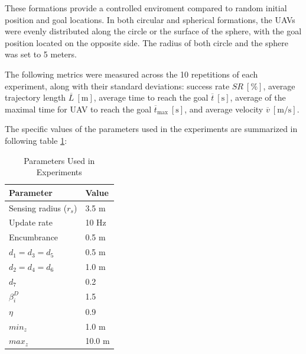         These formations provide a controlled enviroment compared to random initial position and goal locations. 
        In both circular and spherical formations, the \ac{UAV}s were evenly distributed along the circle or the surface of the sphere, with the goal position located on the opposite side.
        The radius of both circle and the sphere was set to 5 meters.
        
        The following metrics were measured across the 10 repetitions of each experiment, along with their standard deviations: success rate \( SR \ [\%] \), average trajectory length \( \overline{L} \ [\mathrm{m}] \), 
        average time to reach the goal \( \overline{t} \ [\mathrm{s}] \), average of the maximal time for \ac{UAV} to reach the goal \( \overline{t}_{\text{max}} \ [\mathrm{s}] \), and average velocity \( \overline{v} \ [\mathrm{m/s}] \).

        The specific values of the parameters used in the experiments are summarized in following table \ref{tab:experiment_parameters}:
        \begin{table}[H]
            \centering
            \caption{Parameters Used in Experiments}
            \begin{tabular}{|l|l|}
                \hline
                Parameter & Value \\
                \hline
                \hline
                Sensing radius ($r_s$) & 3.5 m \\ \hline
                Update rate & 10 Hz \\ \hline
                Encumbrance & 0.5 m \\ \hline
                $d_1 = d_3 = d_5$ & 0.5 m \\ \hline
                $d_2 = d_4 = d_6$ & 1.0 m \\ \hline
                $d_7$ & 0.2  \\ \hline
                $\beta_i^D$ & 1.5  \\ \hline
                $\eta$ & 0.9  \\ \hline
                $min_z$ & 1.0 m \\ \hline
                $max_z$ & 10.0 m \\ \hline

            \end{tabular}
            \label{tab:experiment_parameters}
        \end{table}

